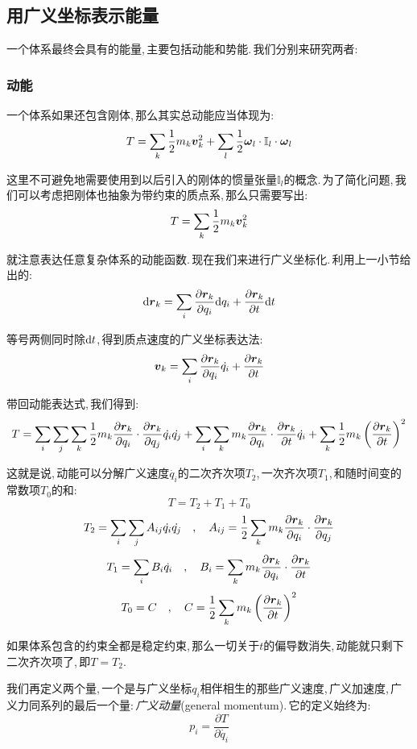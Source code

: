 \subsection{用广义坐标表示能量}

一个体系最终会具有的能量,\,主要包括动能和势能.\,我们分别来研究两者:

\subsubsection{动能}
一个体系如果还包含刚体,\,那么其实总动能应当体现为:
\[T=\sum_k \frac{1}{2}m_k \boldsymbol{v}_k^2+\sum_l\frac{1}{2}\boldsymbol{\omega}_l\cdot \mathbb{I}_l\cdot \boldsymbol{\omega}_l\]

这里不可避免地需要使用到以后引入的刚体的惯量张量$\mathbb{I}_l$的概念.\,为了简化问题,\,我们可以考虑把刚体也抽象为带约束的质点系,\,那么只需要写出:
\[T=\sum_k \frac{1}{2}m_k \boldsymbol{v}_k^2\]

就注意表达任意复杂体系的动能函数.\,现在我们来进行广义坐标化.\,利用上一小节给出的:
\[\textrm{d} \boldsymbol{r}_k=\sum_i \frac{\partial \boldsymbol{r}_k}{\partial q_i}\textrm{d} q_i+\frac{\partial \boldsymbol{r}_k}{\partial t}\textrm{d} t\]

等号两侧同时除$\textrm{d} t$,\,得到质点速度的广义坐标表达法:
\[\boldsymbol{v}_k=\sum_i \frac{\partial \boldsymbol{r}_k}{\partial q_i}\dot{q_i} +\frac{\partial \boldsymbol{r}_k}{\partial t}\]

带回动能表达式,\,我们得到:
\[T=\sum_i\sum_j\sum_k\frac{1}{2}m_k\frac{\partial \boldsymbol{r}_k}{\partial q_i}\cdot\frac{\partial \boldsymbol{r}_k}{\partial q_j}\dot{q_i}\dot{q_j}+\sum_i\sum_k m_k\frac{\partial \boldsymbol{r}_k}{\partial q_i}\cdot\frac{\partial \boldsymbol{r}_k}{\partial t}\dot{q_i}+\sum_k \frac{1}{2}m_k\left(\frac{\partial \boldsymbol{r}_k}{\partial t}\right)^2\]

这就是说,\,动能可以分解广义速度$\dot{q_i}$的二次齐次项$T_2$,\,一次齐次项$T_1$,\,和随时间变的常数项$T_0$的和:
\[T=T_2+T_1+T_0\]
\[T_2=\sum_i\sum_j A_{ij}\dot{q_i}\dot{q_j}\quad,\quad A_{ij}=\frac{1}{2}\sum_k m_k\frac{\partial \boldsymbol{r}_k}{\partial q_i}\cdot\frac{\partial \boldsymbol{r}_k}{\partial q_j}\]
\[T_1=\sum_i B_i \dot{q_i}\quad,\quad B_i=\sum_k m_k\frac{\partial \boldsymbol{r}_k}{\partial q_i}\cdot\frac{\partial \boldsymbol{r}_k}{\partial t}\]
\[T_0=C\quad,\quad C=\frac{1}{2}\sum_k m_k\left(\frac{\partial \boldsymbol{r}_k}{\partial t}\right)^2\]

如果体系包含的约束全都是稳定约束,\,那么一切关于$t$的偏导数消失,\,动能就只剩下二次齐次项了,\,即$T=T_2$.

我们再定义两个量,\,一个是与广义坐标$q_i$相伴相生的那些广义速度,\,广义加速度,\,广义力同系列的最后一个量:\,\emph{广义动量}(general momentum).\,它的定义始终为:
\[p_i=\frac{\partial T}{\partial \dot{q_i}}\]

